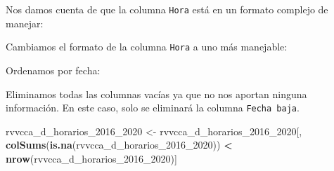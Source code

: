 \documentclass[
]{article}
\newenvironment{Shaded}{\begin{snugshade}}{\end{snugshade}}
\newcommand{\AttributeTok}[1]{\textcolor[rgb]{0.13,0.29,0.53}{#1}}
\newcommand{\FunctionTok}[1]{\textcolor[rgb]{0.13,0.29,0.53}{\textbf{#1}}}
\newcommand{\NormalTok}[1]{#1}
\newcommand{\OtherTok}[1]{\textcolor[rgb]{0.56,0.35,0.01}{#1}}
\newcommand{\SpecialCharTok}[1]{\textcolor[rgb]{0.81,0.36,0.00}{\textbf{#1}}}
\newcommand{\StringTok}[1]{\textcolor[rgb]{0.31,0.60,0.02}{#1}}
\begin{document}
Nos damos cuenta de que la columna \texttt{Hora} está en un formato
complejo de manejar:

\begin{Shaded}
\end{Shaded}

Cambiamos el formato de la columna \texttt{Hora} a uno más manejable:

\begin{Shaded}
\end{Shaded}

Ordenamos por fecha:

\begin{Shaded}
\end{Shaded}

Eliminamos todas las columnas vacías ya que no nos aportan ninguna
información. En este caso, solo se eliminará la columna
\texttt{Fecha\ baja}.

\begin{Shaded}
\begin{Highlighting}[]
\NormalTok{rvvcca\_d\_horarios\_2016\_2020 }\OtherTok{\textless{}{-}}\NormalTok{ rvvcca\_d\_horarios\_2016\_2020[,}
\FunctionTok{colSums}\NormalTok{(}\FunctionTok{is.na}\NormalTok{(rvvcca\_d\_horarios\_2016\_2020)) }\SpecialCharTok{\textless{}} \FunctionTok{nrow}\NormalTok{(rvvcca\_d\_horarios\_2016\_2020)]}
\end{Highlighting}
\end{Shaded}
\end{document}
